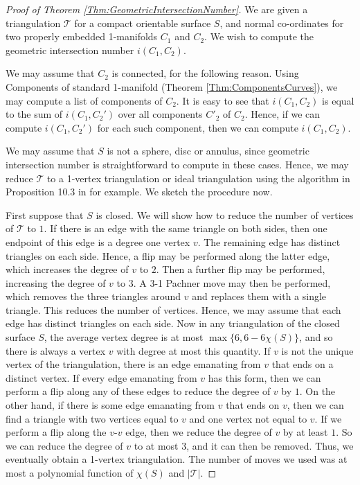 \documentclass[oneside]{amsart}
\numberwithin{equation}{section}
\theoremstyle{plain}
\theoremstyle{definition}
\newcommand{\calT}{{\mathcal{T}}}
\begin{document}
\begin{proof}[Proof of Theorem \ref{Thm:GeometricIntersectionNumber}] 
We are given a triangulation $\calT$ for a compact orientable surface $S$, and normal co-ordinates for two properly embedded 1-manifolds $C_1$ and $C_2$. We wish to compute the geometric intersection number $i(C_1, C_2)$.

We may assume that $C_2$ is connected, for the following reason. Using {\sc Components of standard 1-manifold} (Theorem \ref{Thm:ComponentsCurves}), we may compute a list of components of $C_2$. It is easy to see that $i(C_1, C_2)$ is equal to the sum of $i(C_1, C_2')$ over all components $C'_2$ of $C_2$. Hence, if we can compute $i(C_1, C_2')$ for each such component, then we can compute $i(C_1, C_2)$.

We may assume that $S$ is not a sphere, disc or annulus, since geometric intersection number is straightforward to compute in these cases. Hence, 
we may reduce $\calT$ to a 1-vertex triangulation or ideal triangulation using the algorithm in Proposition 10.3 in \cite{Lackenby:Efficient} for example. We sketch the procedure now.

First suppose that $S$ is closed. We will show how to reduce the number of vertices of $\calT$ to $1$. If there is an edge with the same triangle on both sides, then one endpoint of this edge is a degree one vertex $v$. The remaining edge has distinct triangles on each side. Hence, a flip may be performed along the latter edge, which increases the degree of $v$ to $2$. Then a further flip may be performed, increasing the degree of $v$ to $3$. A 3-1 Pachner move may then be performed, which removes the three triangles around $v$ and replaces them with a single triangle. This reduces the number of vertices. Hence, we may assume that each edge has distinct triangles on each side. Now in any triangulation of the closed surface $S$, the average vertex degree is at most $\max\{ 6, 6 - 6\chi(S)\}$, and so there is always a vertex $v$ with degree at most this quantity. If $v$ is not the unique vertex of the triangulation, there is an edge emanating from $v$ that ends on a distinct vertex. If every edge emanating from $v$ has this form, then we can perform a flip along any of these edges to reduce the degree of $v$ by $1$. On the other hand, if there is some edge emanating from $v$ that ends on $v$, then we can find a triangle with two vertices equal to $v$ and one vertex not equal to $v$. If we perform a flip along the $v$-$v$ edge, then we reduce the degree of $v$ by at least $1$. So we can reduce the degree of $v$ to at most $3$, and it can then be removed. Thus, we eventually obtain a 1-vertex triangulation. The number of moves we used was at most a polynomial function of $\chi(S)$ and $|\calT|$.


\end{proof}
\end{document}
